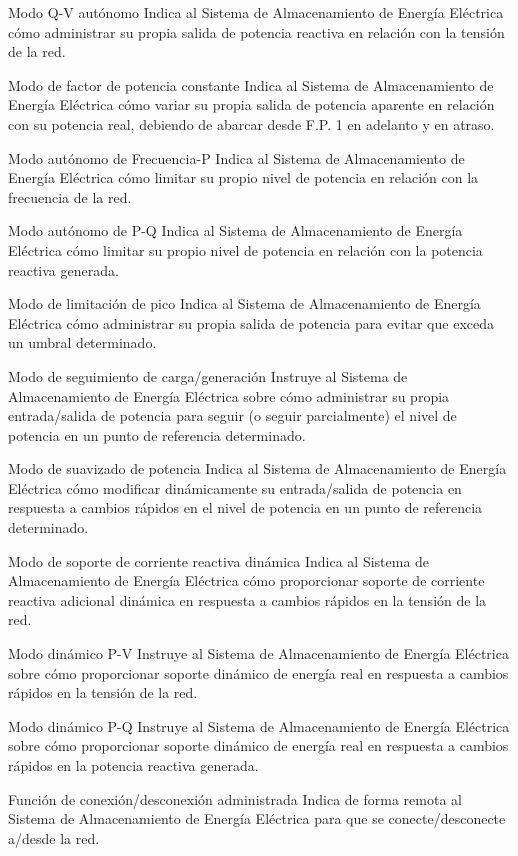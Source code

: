  Modo Q-V autónomo
 Indica al Sistema de Almacenamiento de Energía Eléctrica cómo administrar su propia salida de potencia reactiva en relación con la tensión de la red.
 
 Modo de factor de potencia constante
 Indica al Sistema de Almacenamiento de Energía Eléctrica cómo variar su propia salida de potencia aparente en relación con su potencia real, debiendo de abarcar desde F.P. 1 en adelanto y en atraso.
 
 Modo autónomo de Frecuencia-P
 Indica al Sistema de Almacenamiento de Energía Eléctrica cómo limitar su propio nivel de potencia en relación con la frecuencia de la red.
 
 Modo autónomo de P-Q
 Indica al Sistema de Almacenamiento de Energía Eléctrica cómo limitar su propio nivel de potencia en relación con la potencia reactiva generada.
 
 Modo de limitación de pico
 Indica al Sistema de Almacenamiento de Energía Eléctrica cómo administrar su propia salida de potencia para evitar que exceda un umbral determinado.
 
 Modo de seguimiento de carga/generación
 Instruye al Sistema de Almacenamiento de Energía Eléctrica sobre cómo administrar su propia entrada/salida de potencia para seguir (o seguir parcialmente) el nivel de potencia en un punto de referencia determinado.
 
 Modo de suavizado de potencia
 Indica al Sistema de Almacenamiento de Energía Eléctrica cómo modificar dinámicamente su entrada/salida de potencia en respuesta a cambios rápidos en el nivel de potencia en un punto de referencia determinado.
 
 Modo de soporte de corriente reactiva dinámica
 Indica al Sistema de Almacenamiento de Energía Eléctrica cómo proporcionar soporte de corriente reactiva adicional dinámica en respuesta a cambios rápidos en la tensión de la red.
 
 Modo dinámico P-V
 Instruye al Sistema de Almacenamiento de Energía Eléctrica sobre cómo proporcionar soporte dinámico de energía real en respuesta a cambios rápidos en la tensión de la red.
 
 Modo dinámico P-Q
 Instruye al Sistema de Almacenamiento de Energía Eléctrica sobre cómo proporcionar soporte dinámico de energía real en respuesta a cambios rápidos en la potencia reactiva generada.
 
 Función de conexión/desconexión administrada
 Indica de forma remota al Sistema de Almacenamiento de Energía Eléctrica para que se conecte/desconecte a/desde la red.
 
